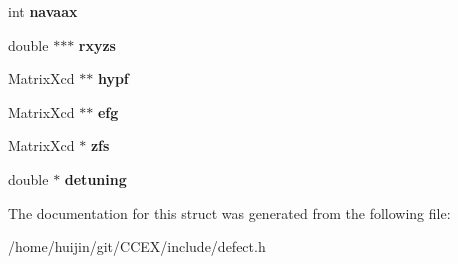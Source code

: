 \begin{DoxyCompactItemize}
\item 
\hypertarget{structDefect_ab816f5aebb89efafbe0ac4f632c17fb1}{int {\bfseries navaax}}\label{structDefect_ab816f5aebb89efafbe0ac4f632c17fb1}

\item 
\hypertarget{structDefect_a170046b2b2a7f4c623da0184b0dd70be}{double $\ast$$\ast$$\ast$ {\bfseries rxyzs}}\label{structDefect_a170046b2b2a7f4c623da0184b0dd70be}

\item 
\hypertarget{structDefect_ababc9cdad7369b2b91935d7ea1cbe9a7}{Matrix\-Xcd $\ast$$\ast$ {\bfseries hypf}}\label{structDefect_ababc9cdad7369b2b91935d7ea1cbe9a7}

\item 
\hypertarget{structDefect_a61772627b5a480389fbfc695cbcbd707}{Matrix\-Xcd $\ast$$\ast$ {\bfseries efg}}\label{structDefect_a61772627b5a480389fbfc695cbcbd707}

\item 
\hypertarget{structDefect_a43ec7a24e386ef84e218a0569fc6f3cc}{Matrix\-Xcd $\ast$ {\bfseries zfs}}\label{structDefect_a43ec7a24e386ef84e218a0569fc6f3cc}

\item 
\hypertarget{structDefect_a0d0e7d439cd2080f0c34986a38071c1e}{double $\ast$ {\bfseries detuning}}\label{structDefect_a0d0e7d439cd2080f0c34986a38071c1e}

\end{DoxyCompactItemize}


The documentation for this struct was generated from the following file\-:\begin{DoxyCompactItemize}
\item 
/home/huijin/git/\-C\-C\-E\-X/include/defect.\-h\end{DoxyCompactItemize}
